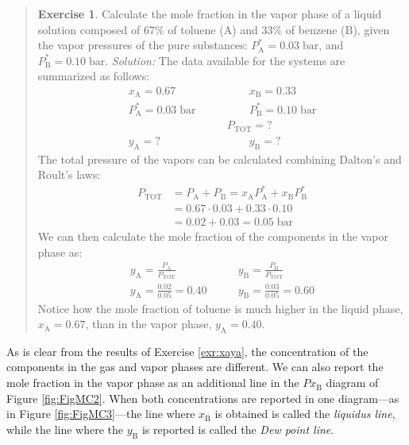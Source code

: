 \documentclass[
  9pt,
]{extbook}
\theoremstyle{definition}
\theoremstyle{definition}
\theoremstyle{definition}
\newtheorem{exercise}{Exercise}[chapter]
\theoremstyle{remark}
\begin{document}
\begin{quote}
\begin{exercise}
\protect\hypertarget{exr:xaya}{}{\label{exr:xaya} }Calculate the mole fraction in the vapor phase of a liquid solution composed of 67\% of toluene (\(\mathrm{A}\)) and 33\% of benzene (\(\mathrm{B}\)), given the vapor pressures of the pure substances: \(P_{\text{A}}^*=0.03\;\text{bar}\), and \(P_{\text{B}}^*=0.10\;\text{bar}\).
\emph{Solution:} The data available for the systems are summarized as follows:
\begin{equation}
\begin{aligned}
x_{\text{A}}=0.67  \qquad & \qquad x_{\text{B}}=0.33 \\
P_{\text{A}}^* = 0.03\;\text{bar} \qquad & \qquad P_{\text{B}}^* = 0.10\;\text{bar} \\
& P_{\text{TOT}} = ? \\
y_{\text{A}}=? \qquad & \qquad y_{\text{B}}=?
\end{aligned}
\label{eq:mc2}
\end{equation}
The total pressure of the vapors can be calculated combining Dalton's and Roult's laws:
\begin{equation}
\begin{aligned}
P_{\text{TOT}} &= P_{\text{A}}+P_{\text{B}}=x_{\text{A}} P_{\text{A}}^* + x_{\text{B}} P_{\text{B}}^* \\
&= 0.67\cdot 0.03+0.33\cdot 0.10 \\
&= 0.02 + 0.03 = 0.05 \;\text{bar}
\end{aligned}
\label{eq:mc3}
\end{equation}
We can then calculate the mole fraction of the components in the vapor phase as:
\begin{equation}
\begin{aligned}
y_{\text{A}}=\frac{P_{\text{A}}}{P_{\text{TOT}}} & \qquad y_{\text{B}}=\frac{P_{\text{B}}}{P_{\text{TOT}}} \\
y_{\text{A}}=\frac{0.02}{0.05}=0.40 & \qquad y_{\text{B}}=\frac{0.03}{0.05}=0.60
\end{aligned}
\label{eq:mc4}
\end{equation}
Notice how the mole fraction of toluene is much higher in the liquid phase, \(x_{\text{A}}=0.67\), than in the vapor phase, \(y_{\text{A}}=0.40\).
\end{exercise}
\end{quote}

As is clear from the results of Exercise \ref{exr:xaya}, the concentration of the components in the gas and vapor phases are different. We can also report the mole fraction in the vapor phase as an additional line in the \(Px_{\text{B}}\) diagram of Figure \ref{fig:FigMC2}. When both concentrations are reported in one diagram---as in Figure \ref{fig:FigMC3}---the line where \(x_{\text{B}}\) is obtained is called the \emph{liquidus line}, while the line where the \(y_{\text{B}}\) is reported is called the \emph{Dew point line}.
\end{document}

